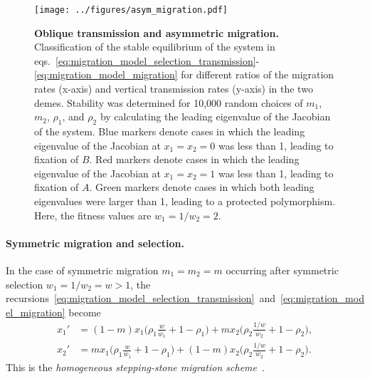 \documentclass[14pt]{extarticle}
\begin{document}
\begin{figure*}[hbt]
\centering
\texttt{[image: ../figures/asym\_migration.pdf]}
\caption{
\textbf{Oblique transmission and asymmetric migration.}
Classification of the stable equilibrium of the system in eqs.~\ref{eq:migration_model_selection_transmission}-\ref{eq:migration_model_migration} for different ratios of the migration rates (x-axis) and vertical transmission rates (y-axis) in the two demes.
Stability was determined for 10,000 random choices of $m_1$, $m_2$, $\rho_1$, and $\rho_2$ by calculating the leading eigenvalue of the Jacobian of the system.
Blue markers denote cases in which the leading eigenvalue of the Jacobian at $x_1=x_2=0$ was less than 1, leading to fixation of $B$.
Red markers denote cases in which the leading eigenvalue of the Jacobian at $x_1=x_2=1$ was less than 1, leading to fixation of $A$.
Green markers denote cases in which both leading eigenvalues were larger than 1, leading to a protected polymorphism.
Here, the fitness values are $w_1=1/w_2=2$.
}
\label{fig:asym_migration}
\end{figure*}

\paragraph{Symmetric migration and selection.}
 
In the case of symmetric migration $m_1=m_2=m$ occurring after symmetric selection $w_1=1/w_2=w>1$, the recursions~\eqref{eq:migration_model_selection_transmission}~and~\eqref{eq:migration_model_migration} become
\begin{equation}\begin{aligned} \label{eq:migration_model_unconditional_symmetric}
x_1' &= (1-m)x_1\Big(\rho_1 \frac{w}{\overline w_1} + 1-\rho_1 \Big) + m x_2\Big(\rho_2 \frac{1/w}{\overline w_2} + 1-\rho_2 \Big), \\
x_2' &= m x_1\Big(\rho_1 \frac{w}{\overline w_1} + 1-\rho_1 \Big) + (1-m) x_2\Big(\rho_2 \frac{1/w}{\overline w_2} + 1-\rho_2 \Big).
\end{aligned}
\end{equation}
This is the \emph{homogeneous stepping-stone migration scheme}~\citep[][eq.~2.14]{Karlin1982}.
\end{document}

